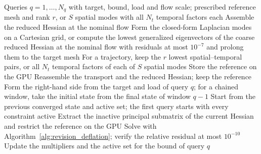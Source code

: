 \begin{algorithm}[htbp]
\caption{The sliced-Hessian procedure builds one reference and reuses it for every inactive-set solve of a query sequence.}
\label{alg:final_procedure}
\begin{algorithmic}[1]
\Require Queries $q=1,\dots,N_q$ with target, bound, load and flow scale; prescribed reference mesh and rank $r$, or $S$ spatial modes with all $N_t$ temporal factors each
\State Assemble the reduced Hessian at the nominal flow
\State Form the closed-form Laplacian modes on a Cartesian grid, or compute the lowest generalized eigenvectors of the coarse reduced Hessian at the nominal flow with residuals at most $10^{-7}$ and prolong them to the target mesh
\State For a trajectory, keep the $r$ lowest spatial--temporal pairs, or all $N_t$ temporal factors of each of $S$ spatial modes
\State Store the reference on the GPU
    \State Reassemble the transport and the reduced Hessian; keep the reference
  \EndIf
  \State Form the right-hand side from the target and load of query $q$; for a chained window, take the initial state from the final state of window $q-1$
  \State Start from the previous converged state and active set; the first query starts with every constraint active
  \Repeat
    \State Extract the inactive principal submatrix of the current Hessian and restrict the reference on the GPU
    \State Solve with Algorithm~\ref{alg:revision_deflation}; verify the relative residual at most $10^{-10}$
    \State Update the multipliers and the active set for the bound of query $q$
\EndFor
\end{algorithmic}
\end{algorithm}
